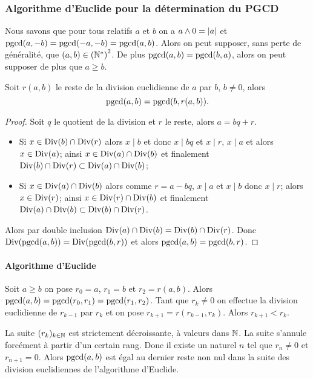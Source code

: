 \subsubsection{Algorithme d'Euclide pour la détermination du PGCD}


Nous savons que pour tous relatifs \(a\) et \(b\) on a \(a \wedge 0 = \left\lvert a\right\rvert\) et \(\operatorname{pgcd}(a,-b) = \operatorname{pgcd}(-a,-b) = \operatorname{pgcd}(a,b)\). Alors on peut supposer, sans perte de généralité, que \((a,b) \in \left(\mathbb{N}^{*}\right)^{2}\). De plus \(\operatorname{pgcd}(a,b) =\operatorname{pgcd}(b,a)\), alors on peut supposer de plus que \(a \geqslant b\).

\begin{lemme}
  Soit \(r(a,b)\) le reste de la division euclidienne de \(a\) par \(b\), \(b \neq 0\), alors
  \begin{equation}
    \operatorname{pgcd}(a,b) = \operatorname{pgcd}(b,r(a,b)).
  \end{equation}
\end{lemme}
\begin{proof}
  Soit \(q\) le quotient de la division et \(r\) le reste, alors \(a=bq+r\).
  \begin{itemize}
  \item Si \(x \in \operatorname{Div}(b) \cap \operatorname{Div}(r)\) alors \(x \mid b\) et donc \(x \mid bq\) et \(x \mid r\), \(x \mid a\) et alors \(x \in \operatorname{Div}(a)\); ainsi \(x \in \operatorname{Div}(a) \cap \operatorname{Div}(b)\) et finalement \(\operatorname{Div}(b) \cap \operatorname{Div}(r) \subset \operatorname{Div}(a) \cap \operatorname{Div}(b)\);
  \item Si \(x \in \operatorname{Div}(a) \cap \operatorname{Div}(b)\) alors comme \(r=a-bq\), \(x \mid a\) et \(x \mid b\) donc \(x \mid r\); alors \(x \in \operatorname{Div}(r)\); ainsi \(x \in \operatorname{Div}(r) \cap \operatorname{Div}(b)\) et finalement \(\operatorname{Div}(a) \cap \operatorname{Div}(b) \subset \operatorname{Div}(b) \cap \operatorname{Div}(r)\).
  \end{itemize}
  Alors par double inclusion \(\operatorname{Div}(a) \cap \operatorname{Div}(b)= \operatorname{Div}(b) \cap \operatorname{Div}(r)\). Donc \(\operatorname{Div}(\operatorname{pgcd}(a,b)) = \operatorname{Div}(\operatorname{pgcd}(b,r))\) et alors \(\operatorname{pgcd}(a,b) = \operatorname{pgcd}(b,r)\).
\end{proof}

\paragraph{Algorithme d'Euclide}

Soit \(a \geqslant b\) on pose \(r_0=a\), \(r_1=b\) et \(r_2=r(a,b)\). Alors \(\operatorname{pgcd}(a,b) = \operatorname{pgcd}(r_0, r_1) = \operatorname{pgcd}(r_1,r_2)\). Tant que \(r_k \neq 0\) on effectue la division euclidienne de \(r_{k-1}\) par \(r_k\) et on pose \(r_{k+1}=r(r_{k-1},r_k)\). Alors \(r_{k+1} < r_k\).

La suite \((r_k)_{k \in \mathbb{N}}\) est strictement décroissante, à valeurs dans \(\mathbb{N}\). La suite s'annule forcément à partir d'un certain rang. Donc il existe un naturel \(n\) tel que \(r_n \neq 0\) et \(r_{n+1}=0\). Alors \(\operatorname{pgcd}(a,b)\) est égal au dernier reste non nul dans la suite des division euclidiennes de l'algorithme d'Euclide.

